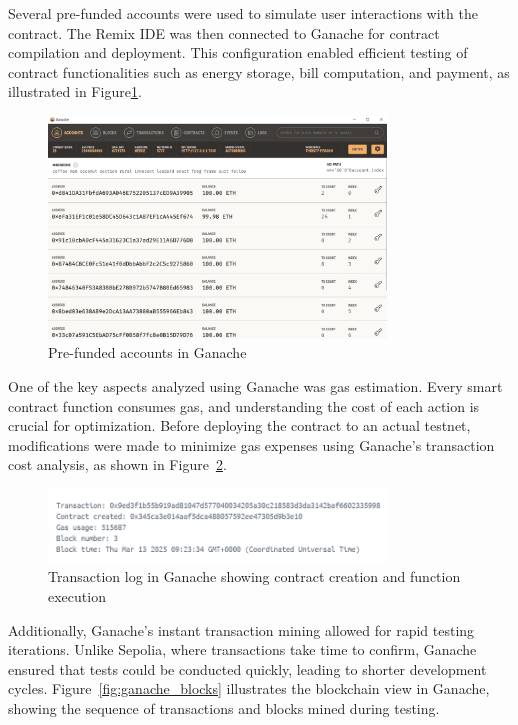 \documentclass[a4paper,12pt]{report}
\begin{document}
Several pre-funded accounts were used to simulate user interactions with the contract. The Remix IDE was then connected to Ganache for contract compilation and deployment. This configuration enabled efficient testing of contract functionalities such as energy storage, bill computation, and payment, as illustrated in Figure\ref{fig:ganache_accounts}.

\begin{figure}[H]
\centering
\includegraphics[width=0.8\textwidth]{chain.PNG}
\caption{Pre-funded accounts in Ganache}
\label{fig:ganache_accounts}
\end{figure}

One of the key aspects analyzed using Ganache was gas estimation. Every smart contract function consumes gas, and understanding the cost of each action is crucial for optimization. Before deploying the contract to an actual testnet, modifications were made to minimize gas expenses using Ganache's transaction cost analysis, as shown in Figure~\ref{fig:ganache_transactions}.

\begin{figure}[H]
\centering
\includegraphics[width=0.8\textwidth]{contract creation.PNG}
\caption{Transaction log in Ganache showing contract creation and function execution}
\label{fig:ganache_transactions}
\end{figure}

Additionally, Ganache's instant transaction mining allowed for rapid testing iterations. Unlike Sepolia, where transactions take time to confirm, Ganache ensured that tests could be conducted quickly, leading to shorter development cycles. Figure~\ref{fig:ganache_blocks} illustrates the blockchain view in Ganache, showing the sequence of transactions and blocks mined during testing.
\end{document}
